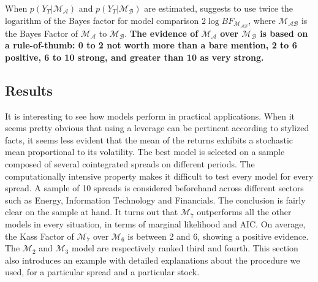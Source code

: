 \documentclass[11pt,a4,twosided,singlespacing,titlepagenumber=on]{scrreprt}
\numberwithin{equation}{chapter} %
\theoremstyle{remark}
\begin{document}
When $p(Y_T | \mathcal{M_A})$ and $p(Y_T | \mathcal{M_B})$ are estimated, \cite{kass1995} suggests to use twice the logarithm of the Bayes factor for model comparison $2 \log BF_{\mathcal{M_{AB}}}$, where $\mathcal{M_{AB}}$ is the Bayes Factor of $\mathcal{M_A}$ to $\mathcal{M_B}$. \textbf{The evidence of $\mathcal{M_A}$ over $\mathcal{M_B}$ is based on a rule-of-thumb: 0 to 2 not worth more than a bare mention, 2 to 6 positive, 6 to 10 strong, and greater than 10 as very strong.}


\subsection{Results}
\label{sec:model_selection}
It is interesting to see how models perform in practical applications. When it seems pretty obvious that using a leverage can be pertinent according to stylized facts, it seems less evident that the mean of the returns exhibits a stochastic mean proportional to its volatility. The best model is selected on a sample composed of several cointegrated spreads on different periods. The computationally intensive property makes it difficult to test every model for every spread. A sample of 10 spreads is considered beforehand across different sectors such as Energy, Information Technology and Financials. The conclusion is fairly clear on the sample at hand. It turns out that $\mathcal{M}_7$ outperforms all the other models in every situation, in terms of marginal likelihood and AIC. On average, the Kass Factor of $\mathcal{M}_7$ over $\mathcal{M}_6$ is between 2 and 6, showing a positive evidence. The $\mathcal{M}_2$ and $\mathcal{M}_3$ model are respectively ranked third and fourth. This section also introduces an example with detailed explanations about the procedure we used, for a particular spread and a particular stock.
\label{sec:model_selection}
\end{document}
